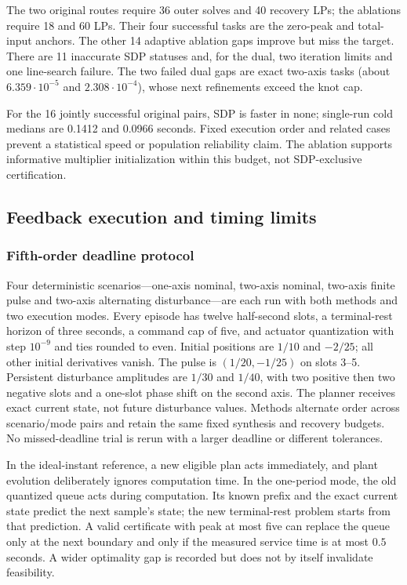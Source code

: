 \documentclass[pdflatex,sn-mathphys-num]{sn-jnl}
\theoremstyle{thmstyleone}
\theoremstyle{thmstyletwo}\newtheorem{remark}[theorem]{Remark}
\begin{document}
The two original routes require 36 outer solves and 40 recovery LPs;
the ablations require 18 and 60 LPs. Their four successful tasks are the
zero-peak and total-input anchors. The other 14 adaptive ablation gaps improve
but miss the target. There are 11 inaccurate SDP statuses and, for the dual,
two iteration limits and one line-search failure. The two failed dual gaps
are exact two-axis tasks (about $6.359\cdot10^{-5}$ and
$2.308\cdot10^{-4}$), whose next refinements exceed the knot cap.

For the 16 jointly successful original pairs, SDP is faster in none;
single-run cold medians are 0.1412 and 0.0966 seconds. Fixed execution order
and related cases prevent a statistical speed or population reliability
claim. The ablation supports informative multiplier initialization within
this budget, not SDP-exclusive certification.


\subsection{Feedback execution and timing limits}\label{sec:five-feedback}
\subsubsection{Fifth-order deadline protocol}
Four deterministic scenarios---one-axis nominal, two-axis nominal, two-axis
finite pulse and two-axis alternating disturbance---are each run with both
methods and two execution modes. Every episode has twelve half-second slots,
a terminal-rest horizon of three seconds, a command cap of five, and actuator
quantization with step $10^{-9}$ and ties rounded to even. Initial positions are $1/10$ and $-2/25$;
all other initial derivatives vanish. The pulse is $(1/20,-1/25)$ on slots
3--5. Persistent disturbance amplitudes are $1/30$ and $1/40$, with two positive
then two negative slots and a one-slot phase shift on the second axis.
The planner receives exact current state, not future disturbance values.
Methods alternate order across scenario/mode pairs and retain the same
fixed synthesis and recovery budgets. No missed-deadline trial is rerun
with a larger deadline or different tolerances.

In the ideal-instant reference, a new eligible plan acts immediately, and
plant evolution deliberately ignores computation time. In the one-period
mode, the old quantized queue acts during computation. Its known prefix
and the exact current state predict the next sample's state; the new
terminal-rest problem starts from that prediction. A valid certificate with
peak at most five can replace the queue only at the next boundary and only
if the measured service time is at most $0.5$ seconds. A wider optimality
gap is recorded but does not by itself invalidate feasibility.
\end{document}
